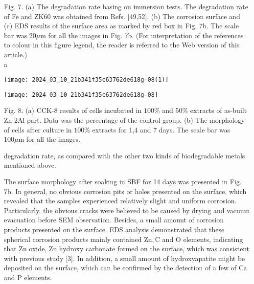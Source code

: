 \documentclass[10pt]{article}
\begin{document}
Fig. 7. (a) The degradation rate basing on immersion tests. The degradation rate of Fe and ZK60 was obtained from Refs. [49,52]. (b) The corrosion surface and (c) EDS results of the surface area as marked by red box in Fig. 7b. The scale bar was $20 \mu \mathrm{m}$ for all the images in Fig. 7b. (For interpretation of the references to colour in this figure legend, the reader is referred to the Web version of this article.)\\
a

\begin{center}
\texttt{[image: 2024\_03\_10\_21b341f35c63762de618g-08(1)]}
\end{center}

\begin{center}
\texttt{[image: 2024\_03\_10\_21b341f35c63762de618g-08]}
\end{center}

Fig. 8. (a) CCK-8 results of cells incubated in $100 \%$ and $50 \%$ extracts of as-built Zn-2Al part. Data was the percentage of the control group. (b) The morphology of cells after culture in $100 \%$ extracts for 1,4 and 7 days. The scale bar was $100 \mu \mathrm{m}$ for all the images.

degradation rate, as compared with the other two kinds of biodegradable metals mentioned above.

The surface morphology after soaking in SBF for 14 days was presented in Fig. 7b. In general, no obvious corrosion pits or holes presented on the surface, which revealed that the samples experienced relatively slight and uniform corrosion. Particularly, the obvious cracks were believed to be caused by drying and vacuum evacuation before SEM observation. Besides, a small amount of corrosion products presented on the surface. EDS analysis demonstrated that these spherical corrosion products mainly contained $\mathrm{Zn}, \mathrm{C}$ and $\mathrm{O}$ elements, indicating that $\mathrm{Zn}$ oxide, $\mathrm{Zn}$ hydroxy carbonate formed on the surface, which was consistent with previous study [3]. In addition, a small amount of hydroxyapatite might be deposited on the surface, which can be confirmed by the detection of a few of $\mathrm{Ca}$ and $\mathrm{P}$ elements.
\end{document}
